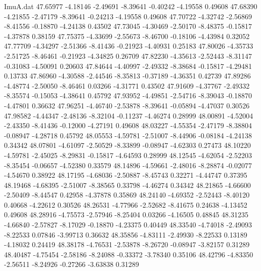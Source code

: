 \begin{filecontents}{ImuA.dat}
  47.65977   -4.18146   -2.49691   -8.39641   -0.40242   -4.19558    0.49608
  47.68390   -4.21855   -2.47179   -8.39641   -0.24213   -4.19558    0.49608
  47.70722   -4.32742   -2.56869   -8.41556   -0.18870   -4.24138    0.43502
  47.73045   -4.30469   -2.50170   -8.48375   -0.15817   -4.37878    0.38159
  47.75375   -4.33699   -2.55673   -8.46700   -0.18106   -4.43984    0.32052
  47.77709   -4.34297   -2.51366   -8.41436   -0.21923   -4.40931    0.25183
  47.80026   -4.35733   -2.51725   -8.46461   -0.21923   -4.34825    0.26709
  47.82230   -4.35613   -2.52443   -8.31147   -0.31083   -4.50091    0.20603
  47.84644   -4.40997   -2.49332   -8.38684   -0.15817   -4.29481    0.13733
  47.86960   -4.30588   -2.44546   -8.35813   -0.37189   -4.36351    0.42739
  47.89286   -4.48774   -2.50050   -8.46461    0.03266   -4.31771    0.43502
  47.91609   -4.37767   -2.49332   -8.35574   -0.15053   -4.38641    0.45792
  47.93952   -4.49851   -2.54716   -8.39043   -0.18870   -4.47801    0.36632
  47.96251   -4.46740   -2.53878   -8.39641   -0.05894   -4.47037    0.30526
  47.98582   -4.44347   -2.48136   -8.32104   -0.11237   -4.46274    0.28999
  48.00891   -4.52004   -2.43350   -8.41436   -0.12000   -4.27191    0.49608
  48.03227   -4.55354   -2.47179   -8.38804   -0.08947   -4.28718    0.45792
  48.05553   -4.59781   -2.51007   -8.44906   -0.08184   -4.24138    0.34342
  48.07801   -4.61097   -2.50529   -8.33899   -0.08947   -4.62303    0.27473
  48.10220   -4.59781   -2.45025   -8.29831   -0.15817   -4.64593    0.28999
  48.12545   -4.62054   -2.52203   -8.35454   -0.06657   -4.52380    0.33579
  48.14896   -4.59661   -2.48016   -8.28874   -0.02077   -4.54670    0.38922
  48.17195   -4.68036   -2.50887   -8.45743    0.32271   -4.44747    0.37395
  48.19468   -4.68395   -2.51007   -8.38565    0.33798   -4.46274    0.34342
  48.21865   -4.66600   -2.50409   -8.44547    0.42958   -4.37878    0.35869
  48.24140   -4.69352   -2.52443   -8.40120    0.40668   -4.22612    0.30526
  48.26531   -4.77966   -2.52682   -8.41675    0.24638   -4.13452    0.49608
  48.28916   -4.75573   -2.57946   -8.25404    0.03266   -4.16505    0.48845
  48.31235   -4.66840   -2.57827   -8.17029   -0.18870   -4.23375    0.40449
  48.33540   -4.74018   -2.49093   -8.22533    0.07846   -3.99713    0.36632
  48.35856   -4.83111   -2.49930   -8.22533    0.13189   -4.18032    0.24419
  48.38178   -4.76531   -2.53878   -8.26720   -0.08947   -3.82157    0.31289
  48.40487   -4.75454   -2.58186   -8.24088   -0.33372   -3.78340    0.35106
  48.42796   -4.83350   -2.56511   -8.24926   -0.27266   -3.63838    0.31289

\end{filecontents}
